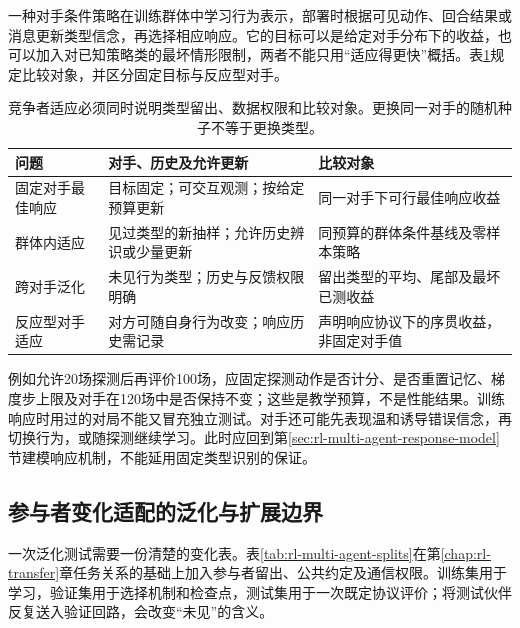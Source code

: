 一种对手条件策略在训练群体中学习行为表示，部署时根据可见动作、回合结果或消息更新类型信念，再选择相应响应。它的目标可以是给定对手分布下的收益，也可以加入对已知策略类的最坏情形限制，两者不能只用“适应得更快”概括。表\ref{tab:rl-multi-agent-opponent-adaptation}规定比较对象，并区分固定目标与反应型对手。

\begin{table}[htbp]
 \centering
 \begin{tabularx}{\linewidth}{@{}l >{\raggedright\arraybackslash}X >{\raggedright\arraybackslash}X@{}}
 \toprule
 问题 & 对手、历史及允许更新 & 比较对象\\
 \midrule
 固定对手最佳响应 & 目标固定；可交互观测；按给定预算更新 & 同一对手下可行最佳响应收益\\
 群体内适应 & 见过类型的新抽样；允许历史辨识或少量更新 & 同预算的群体条件基线及零样本策略\\
 跨对手泛化 & 未见行为类型；历史与反馈权限明确 & 留出类型的平均、尾部及最坏已测收益\\
 反应型对手适应 & 对方可随自身行为改变；响应历史需记录 & 声明响应协议下的序贯收益，非固定对手值\\
 \bottomrule
 \end{tabularx}
 \caption{竞争者适应必须同时说明类型留出、数据权限和比较对象。更换同一对手的随机种子不等于更换类型。}
 \label{tab:rl-multi-agent-opponent-adaptation}
\end{table}

例如允许20场探测后再评价100场，应固定探测动作是否计分、是否重置记忆、梯度步上限及对手在120场中是否保持不变；这些是教学预算，不是性能结果。训练响应时用过的对局不能又冒充独立测试。对手还可能先表现温和诱导错误信念，再切换行为，或随探测继续学习。此时应回到第\ref{sec:rl-multi-agent-response-model}节建模响应机制，不能延用固定类型识别的保证。

\subsection{参与者变化适配的泛化与扩展边界}
\label{sec:rl-multi-agent-generalization}

一次泛化测试需要一份清楚的变化表。表\ref{tab:rl-multi-agent-splits}在第\ref{chap:rl-transfer}章任务关系的基础上加入参与者留出、公共约定及通信权限。训练集用于学习，验证集用于选择机制和检查点，测试集用于一次既定协议评价；将测试伙伴反复送入验证回路，会改变“未见”的含义。


